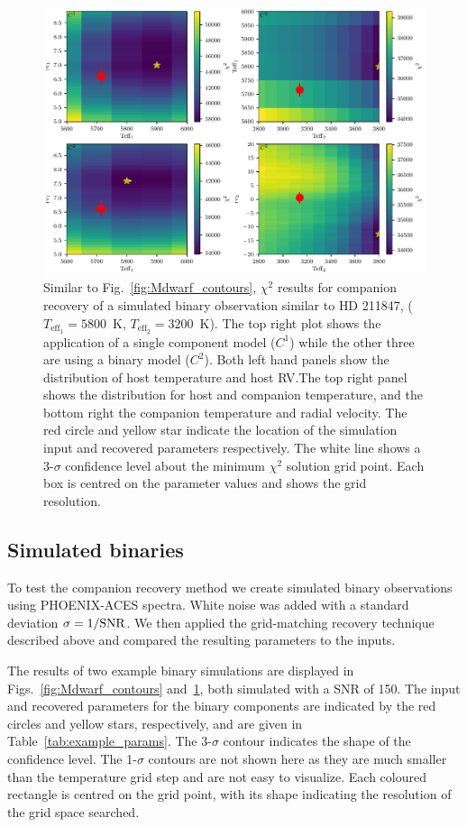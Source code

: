 \documentclass[fleqn,usenatbib]{mnras}
\newcommand*\bl{\color{blue}}
\begin{document}
    
    \begin{figure}
        \centering
        \includegraphics[width=0.8\hsize]{images/fig4.pdf}
        \caption{Similar to Fig.~\ref{fig:Mdwarf_contours}, \(\chi^2\) results for companion recovery of a simulated binary observation similar to {HD 211847}, (\(T_{\textrm{eff}_1} = 5800\)~K, \(T_{\textrm{eff}_2}=3200\)~K). The top right plot shows the application of a single component model (\(C^1\)) while the other three are using a binary model (\(C^2\)). Both left hand panels show the distribution of host temperature and host RV.\@ The top right panel shows the distribution for host and companion temperature, and the bottom right the companion temperature and radial velocity.
        The red circle and yellow star indicate the location of the simulation input and recovered parameters respectively.
        The white line shows a 3-\(\sigma\) confidence level about the minimum \(\chi^2\) solution grid point. Each box is centred on the parameter values and shows the grid resolution.}
        \label{fig:HD211847_simulated_contours}
    \end{figure}
    
    \subsection{Simulated binaries}
    \label{subsec:simulated_binaries}
    To test the companion recovery method we create simulated binary observations using PHOENIX-ACES spectra. White noise was added with a standard deviation \(\rm \sigma = 1/SNR\). We then applied the grid-matching recovery technique {\bl described} above and compared the resulting parameters to the inputs.
    
    The results of two example binary simulations are displayed in Figs.~\ref{fig:Mdwarf_contours} and~\ref{fig:HD211847_simulated_contours}, both simulated with a SNR of 150. The input and recovered parameters for the binary components are indicated by the red circles and yellow stars, respectively, and are given in Table~\ref{tab:example_params}.
    The 3-\(\sigma\) contour {\bl indicates the shape of the confidence level.} The 1-\(\sigma\) contours are not shown here as they are much smaller than the temperature grid step and are not easy to visualize. Each coloured rectangle is centred on the grid point, with its shape indicating the resolution of the grid space searched.
    
\end{document}
